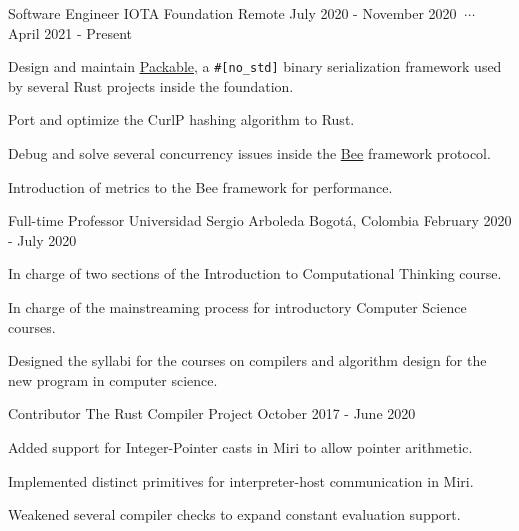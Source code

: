 


\begin{cventries}

    \cventry
    {Software Engineer}
    {IOTA Foundation}
    {Remote}
    {July 2020 - November 2020 $\ \cdots\ $ April 2021 - Present}
    {
        \begin{cvitems}
        \item Design and maintain \href{https://crates.io/crates/packable}{\underline{Packable}}, a \texttt{\#[no\_std]} binary serialization framework used by several Rust projects inside the foundation.
        \item Port and optimize the CurlP hashing algorithm to Rust.
        \item Debug and solve several concurrency issues inside the \href{https://github.com/iotaledger/bee/}{\underline{Bee}} framework protocol.
        \item Introduction of metrics to the Bee framework for performance.
        \end{cvitems}
    }

    \cventry
    {Full-time Professor}
    {Universidad Sergio Arboleda}
    {Bogotá, Colombia}
    {February 2020 - July 2020}
    {
        \begin{cvitems}
        \item In charge of two sections of the Introduction to Computational Thinking course.
        \item In charge of the mainstreaming process for introductory Computer Science courses.
        \item Designed the syllabi for the courses on compilers and algorithm design for the new program in computer science.
        \end{cvitems}
    }

    \cventry
    {Contributor}
    {The Rust Compiler Project}
    {}
    {October 2017 - June 2020}
    {
        \begin{cvitems}
        \item Added support for Integer-Pointer casts in Miri to allow pointer arithmetic.
        \item Implemented distinct primitives for interpreter-host communication in Miri.
        \item Weakened several compiler checks to expand constant evaluation support.
        \end{cvitems}
    }


\end{cventries}
